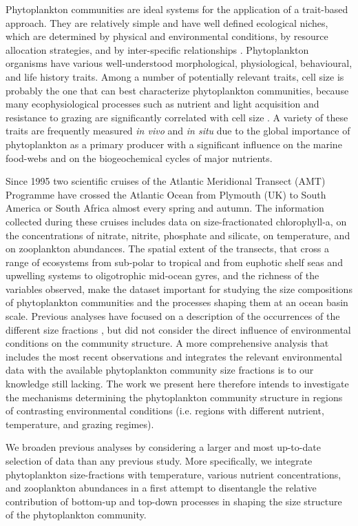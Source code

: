 Phytoplankton communities are ideal systems for the application of a trait-based approach. They are relatively simple and have well defined ecological niches, which are determined by physical and environmental conditions, by resource allocation strategies, and by inter-specific relationships \citep{Litchman2007}. Phytoplankton organisms have various well-understood morphological, physiological, behavioural, and life history traits. Among a number of potentially relevant traits, cell size is probably the one that can best characterize phytoplankton communities, because many ecophysiological processes such as nutrient and light acquisition and resistance to grazing are significantly correlated with cell size \citep{Litchman2008,Litchman2010}. A variety of these traits are frequently measured \textit{in vivo} and \textit{in situ} due to the global importance of phytoplankton as a primary producer with a significant influence on the marine food-webs and on the biogeochemical cycles of major nutrients\citep{Falkowski1998}.

Since 1995 two scientific cruises of the Atlantic Meridional Transect (AMT) Programme have crossed the Atlantic Ocean from Plymouth (UK) to South America or South Africa almost every spring and autumn. The information collected during these cruises includes data on size-fractionated chlorophyll-a, on the concentrations of nitrate, nitrite, phosphate and silicate, on temperature, and on zooplankton abundances. The spatial extent of the transects, that cross a range of ecosystems from sub-polar to tropical and from euphotic shelf seas and upwelling systems to oligotrophic mid-ocean gyres, and the richness of the variables observed, make the dataset important for studying the size compositions of phytoplankton communities and the processes shaping them at an ocean basin scale. Previous analyses have focused on a description of the occurrences of the different size fractions \citep{Maranon2001}, but did not consider the direct influence of environmental conditions on the community structure. A more comprehensive analysis that includes the most recent observations and integrates the relevant environmental data with the available phytoplankton community size fractions is to our knowledge still lacking. The work we present here therefore intends to investigate the mechanisms determining the phytoplankton community structure in regions of contrasting environmental conditions (i.e. regions with different nutrient, temperature, and grazing regimes).

We broaden previous analyses by considering a larger and most up-to-date selection of data than any previous study. More specifically, we integrate phytoplankton size-fractions with temperature, various nutrient concentrations, and zooplankton abundances in a first attempt to disentangle the relative contribution of bottom-up and top-down processes in shaping the size structure of the phytoplankton community.

